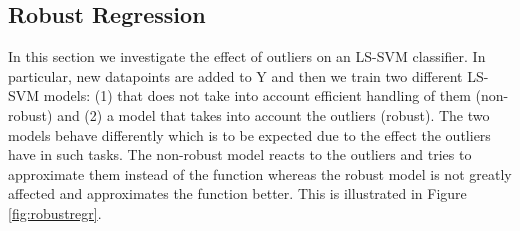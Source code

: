\documentclass[a4paper, 11pt, one column]{article}
\begin{document}
\subsection{Robust Regression}
In this section we investigate the effect of outliers on an LS-SVM classifier. In particular, new datapoints are added to Y and then we train two different LS-SVM models: (1) that does not take into account efficient handling of them (non-robust) and (2) a model that takes into account the outliers (robust). The two models behave differently which is to be expected due to the effect the outliers have in such tasks. The non-robust model reacts to the outliers and tries to approximate them instead of the function whereas the robust model is not greatly affected and approximates the function better. This is illustrated in Figure \ref{fig:robustregr}. 
\end{document}
